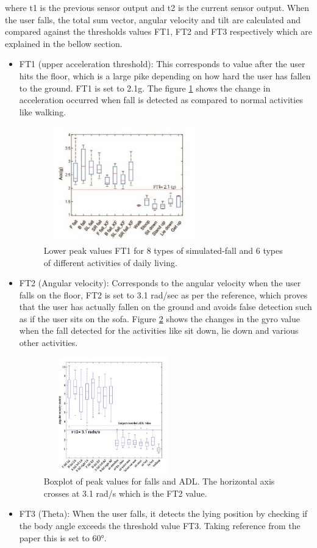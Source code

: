 \documentclass[conference]{IEEEtran}
\begin{document}
where t1 is the previous sensor output and t2 is the current sensor output.
When the user falls, the total sum vector, angular velocity and tilt are calculated and compared against the thresholds values FT1, FT2 and FT3 respectively which are explained in the bellow section.
\begin{itemize}
    \item FT1 (upper acceleration threshold): This corresponds to value after the user hits the floor, which is a large pike depending on how hard the user has fallen to the ground. FT1 is set to 2.1g. The figure \ref{FT1} shows the change in acceleration occurred when fall is detected as compared to normal activities like walking.
\begin{figure}
\centerline{\includegraphics[width=7cm, height=5cm]{FT1 V2.png}}
\caption{Lower peak values FT1 for 8 types of simulated-fall and 6 types of different activities of daily living.}
\label{FT1}
\end{figure}
    \item FT2 (Angular velocity): Corresponds to the angular velocity when the user falls on the floor, FT2 is set to 3.1 rad/sec as per the reference\cite{b8},  which proves that the user has actually fallen on the ground and avoids false detection such as if the user sits on the sofa. Figure \ref{FT2} shows the changes in the gyro value when the fall detected for the activities like sit down, lie down and various other activities.

\begin{figure}
\centerline{\includegraphics[width=6cm, height=5cm]{FT2 updated.png}}
\caption{Boxplot of peak values for falls and ADL. The horizontal axis crosses at 3.1 rad/s which is the FT2 value.\cite{b8}}
\label{FT2}
\end{figure}    

 \item FT3 (Theta): When the user falls, it detects the lying position by checking if the body angle exceeds the threshold value FT3. Taking reference from the paper \cite{b7} this is set to 60°.


\end{itemize}
\end{document}
